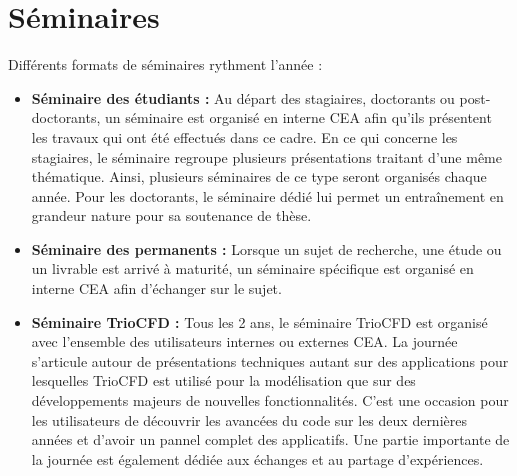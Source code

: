 \chapter{S\'eminaires}

Diff\'erents formats de s\'eminaires rythment l'ann\'ee :
\begin{itemize}[label=$\Rightarrow$, font=\LARGE]
\item \textbf{S\'eminaire des \'etudiants :} Au d\'epart des stagiaires, doctorants ou post-doctorants, un s\'eminaire est organis\'e en interne CEA afin qu'ils pr\'esentent les travaux qui ont \'et\'e effectu\'es dans ce cadre. En ce qui concerne les stagiaires, le s\'eminaire regroupe plusieurs pr\'esentations traitant d'une m\^eme th\'ematique.
Ainsi, plusieurs s\'eminaires de ce type seront organis\'es chaque ann\'ee. Pour les doctorants, le s\'eminaire d\'edi\'e lui permet un entra\^inement en grandeur nature pour sa soutenance de th\`ese.
\item \textbf{S\'eminaire des permanents :} Lorsque un sujet de recherche, une \'etude ou un livrable est arriv\'e \`a maturit\'e, un s\'eminaire sp\'ecifique est organis\'e en interne CEA afin d'\'echanger sur le sujet.
\item \textbf{S\'eminaire TrioCFD :} Tous les 2 ans, le s\'eminaire TrioCFD est organis\'e avec l'ensemble des utilisateurs internes ou externes CEA. La journ\'ee s'articule autour de pr\'esentations techniques autant sur des applications pour lesquelles TrioCFD est utilis\'e pour la mod\'elisation que sur des d\'eveloppements majeurs de nouvelles fonctionnalit\'es. C'est une occasion pour les utilisateurs de d\'ecouvrir les avanc\'ees du code sur les deux derni\`eres ann\'ees et d'avoir un pannel complet des applicatifs. Une partie importante de la journ\'ee est \'egalement d\'edi\'ee aux \'echanges et au partage d'exp\'eriences.
\end{itemize}


